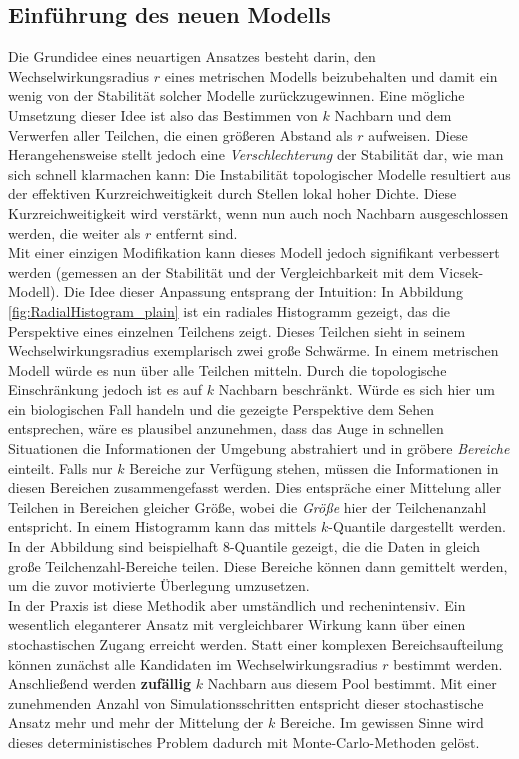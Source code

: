 \documentclass{solutionclass}
\begin{document}
\subsection{Einführung des neuen Modells}

Die Grundidee eines neuartigen Ansatzes besteht darin, den Wechselwirkungsradius $r$ eines metrischen Modells beizubehalten und damit ein wenig von der Stabilität solcher Modelle zurückzugewinnen. Eine mögliche Umsetzung dieser Idee ist also das Bestimmen von $k$ Nachbarn und dem Verwerfen aller Teilchen, die einen größeren Abstand als $r$ aufweisen. Diese Herangehensweise stellt jedoch eine \textit{Verschlechterung} der Stabilität dar, wie man sich schnell klarmachen kann: Die Instabilität topologischer Modelle resultiert aus der effektiven Kurzreichweitigkeit durch Stellen lokal hoher Dichte. Diese Kurzreichweitigkeit wird verstärkt, wenn nun auch noch Nachbarn ausgeschlossen werden, die weiter als $r$ entfernt sind.\\

Mit einer einzigen Modifikation kann dieses Modell jedoch signifikant verbessert werden (gemessen an der Stabilität und der Vergleichbarkeit mit dem Vicsek-Modell). Die Idee dieser Anpassung entsprang der Intuition: In Abbildung \ref{fig:RadialHistogram_plain} ist ein radiales Histogramm gezeigt, das die Perspektive eines einzelnen Teilchens zeigt. Dieses Teilchen sieht in seinem Wechselwirkungsradius exemplarisch zwei große Schwärme. In einem metrischen Modell würde es nun über alle Teilchen mitteln. Durch die topologische Einschränkung jedoch ist es auf $k$ Nachbarn beschränkt. Würde es sich hier um ein biologischen Fall handeln und die gezeigte Perspektive dem Sehen entsprechen, wäre es plausibel anzunehmen, dass das Auge in schnellen Situationen die Informationen der Umgebung abstrahiert und in gröbere \textit{Bereiche} einteilt. Falls nur $k$ Bereiche zur Verfügung stehen, müssen die Informationen in diesen Bereichen zusammengefasst werden. Dies entspräche einer Mittelung aller Teilchen in Bereichen gleicher Größe, wobei die \textit{Größe} hier der Teilchenanzahl entspricht. In einem Histogramm kann das mittels $k$-Quantile dargestellt werden. In der Abbildung sind beispielhaft $8$-Quantile gezeigt, die die Daten in gleich große Teilchenzahl-Bereiche teilen. Diese Bereiche können dann gemittelt werden, um die zuvor motivierte Überlegung umzusetzen.\\

In der Praxis ist diese Methodik aber umständlich und rechenintensiv. Ein wesentlich eleganterer Ansatz mit vergleichbarer Wirkung kann über einen stochastischen Zugang erreicht werden. Statt einer komplexen Bereichsaufteilung können zunächst alle Kandidaten im Wechselwirkungsradius $r$ bestimmt werden. Anschließend werden \textbf{zufällig} $k$ Nachbarn aus diesem Pool bestimmt. Mit einer zunehmenden Anzahl von Simulationsschritten entspricht dieser stochastische Ansatz mehr und mehr der Mittelung der $k$ Bereiche. Im gewissen Sinne wird dieses deterministisches Problem dadurch mit Monte-Carlo-Methoden gelöst.
\end{document}
